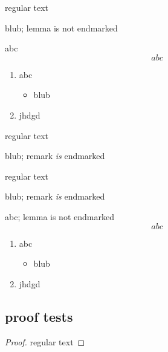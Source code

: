 \documentclass[leqno]{article}
\begin{document}
\begin{theorem}
regular text
\begin{lemma}
blub; lemma is not endmarked
\end{lemma}
\begin{lemma}
abc
\begin{equation*}
abc
\end{equation*}
\begin{enumerate}
\item abc
\begin{itemize}
\item blub
\end{itemize}
\item jhdgd
\end{enumerate}
\end{lemma}
\end{theorem}

\begin{theorem}
regular text
\begin{remark}
blub; remark \emph{is} endmarked
\end{remark}
\end{theorem}


\begin{theorem}
regular text
\begin{remark}
blub; remark \emph{is} endmarked
\end{remark}
\begin{lemma}
abc; lemma is not endmarked
\begin{equation*}
abc
\end{equation*}
\begin{enumerate}
\item abc
\begin{itemize}
\item blub
\end{itemize}
\item jhdgd
\end{enumerate}
\end{lemma}
\end{theorem}




\clearpage

\subsection{proof tests}

\begin{proof}
regular text
\end{proof}
\end{document}
